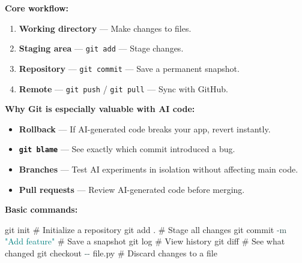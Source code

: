 \documentclass[
  justified,
  openright,
]{tufte-book}
\newcommand{\AttributeTok}[1]{\textcolor{DarkSlateGray}{#1}}
\newcommand{\CommentTok}[1]{\textcolor{MidGray}{#1}}
\newcommand{\FunctionTok}[1]{\textcolor{BrandBlue}{#1}}
\newcommand{\NormalTok}[1]{#1}
\newcommand{\StringTok}[1]{\textcolor{Teal}{#1}}
\newenvironment{Shaded}{%
  \begin{snugshade}
}{%
  \end{snugshade}
}
\providecommand{\tightlist}{%
  \setlength{\itemsep}{0pt}\setlength{\parskip}{0pt}}
\begin{document}
\textbf{Core workflow:}

\begin{enumerate}
\def\labelenumi{\arabic{enumi}.}
\tightlist
\item
  \textbf{Working directory} --- Make changes to files.
\item
  \textbf{Staging area} --- \texttt{git\ add} --- Stage changes.
\item
  \textbf{Repository} --- \texttt{git\ commit} --- Save a permanent
  snapshot.
\item
  \textbf{Remote} --- \texttt{git\ push} / \texttt{git\ pull} --- Sync
  with GitHub.
\end{enumerate}

\textbf{Why Git is especially valuable with AI code:}

\begin{itemize}
\tightlist
\item
  \textbf{Rollback} --- If AI-generated code breaks your app, revert
  instantly.
\item
  \textbf{\texttt{git\ blame}} --- See exactly which commit introduced a
  bug.
\item
  \textbf{Branches} --- Test AI experiments in isolation without
  affecting main code.
\item
  \textbf{Pull requests} --- Review AI-generated code before merging.
\end{itemize}

\textbf{Basic commands:}

\begin{Shaded}
\begin{Highlighting}[]
\FunctionTok{git}\NormalTok{ init                    }\CommentTok{\# Initialize a repository}
\FunctionTok{git}\NormalTok{ add .                   }\CommentTok{\# Stage all changes}
\FunctionTok{git}\NormalTok{ commit }\AttributeTok{{-}m} \StringTok{"Add feature"} \CommentTok{\# Save a snapshot}
\FunctionTok{git}\NormalTok{ log                     }\CommentTok{\# View history}
\FunctionTok{git}\NormalTok{ diff                    }\CommentTok{\# See what changed}
\FunctionTok{git}\NormalTok{ checkout }\AttributeTok{{-}{-}}\NormalTok{ file.py     }\CommentTok{\# Discard changes to a file}
\end{Highlighting}
\end{Shaded}
\end{document}
